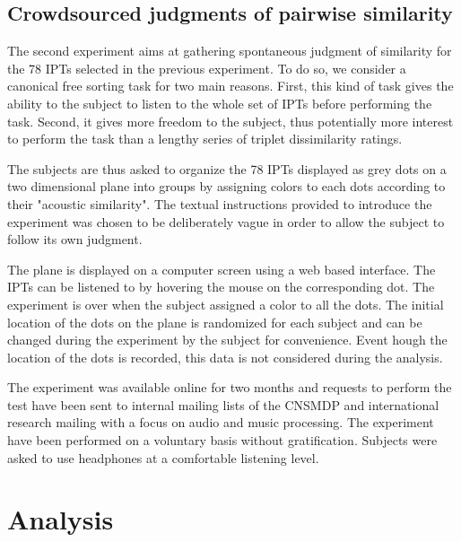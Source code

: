 \documentclass{article}
\newcommand{\ipts}{IPTs\xspace}
\begin{document}
\subsection{Crowdsourced judgments of pairwise similarity}

The second experiment aims at gathering spontaneous judgment of similarity for the 78 \ipts selected in the previous experiment. To do so, we consider a canonical free sorting task for two main reasons. First, this kind of task gives the ability to the subject to listen to the whole set of \ipts before performing the task. Second, it gives more freedom to the subject, thus potentially more interest to perform the task than a lengthy series of triplet dissimilarity ratings.

The subjects are thus asked to organize the 78 \ipts displayed as grey dots on a two dimensional plane into groups by assigning colors to each dots according to their "acoustic similarity". The textual instructions provided to introduce the experiment was chosen to be deliberately vague in order to allow the subject to follow its own judgment.

The plane is displayed on a computer screen using a web based interface. The \ipts can be listened to by hovering the mouse on the corresponding dot. The experiment is over when the subject assigned a color to all the dots. The initial location of the dots on the plane is randomized for each subject and can be changed during the experiment by the subject for convenience. Event hough the location of the dots is recorded, this data is not considered during the analysis.

The experiment was available online for two months and requests to perform the test have been sent to internal mailing lists of the CNSMDP and international research mailing with a focus on audio and music processing. The experiment have been performed on a voluntary basis without gratification. Subjects were asked to use headphones at a comfortable listening level.

\section{Analysis}\label{sec:analysis}
\end{document}
